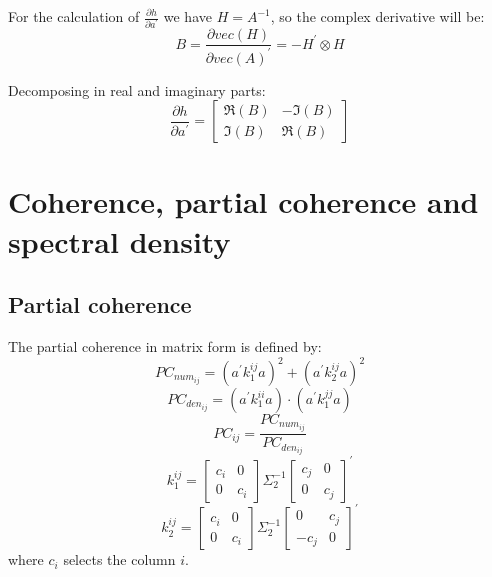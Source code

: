 \documentclass[a4paper,10pt]{article}
\begin{document}
For the calculation of  $\frac{\partial h}{\partial a^{'}}$ we have $H = A^{-1}$, so the complex derivative will be:
\begin{equation}
B = \frac{\partial vec(H)}{\partial vec(A)^{'}} = -H^{'} \otimes H
\end{equation}

Decomposing in real and imaginary parts:
\begin{equation}
\frac{\partial h}{\partial a^{'}} = \left[ \begin{array}{cc} \Re(B) & -\Im(B) \\ \Im(B) & \Re(B)
\end{array} \right]
\end{equation}

\section{Coherence, partial coherence and spectral density}

\subsection{Partial coherence}

The partial coherence in matrix form is defined by:
\begin{equation}
PC_{num_{ij}} = \left( a^{'} k_{1}^{ij} a \right)^{2} + \left( a^{'} k_{2}^{ij} a \right)^{2}
\end{equation}
\begin{equation}
PC_{den_{ij}} = \left( a^{'} k_{1}^{ii} a \right) \cdot \left( a^{'} k_{1}^{jj} a \right)
\end{equation}
\begin{equation}
PC_{ij} = \frac{PC_{num_{ij}}}{PC_{den_{ij}}}
\end{equation}
\begin{equation}
k_{1}^{ij} = \left[ \begin{array}{cc}
 c_{i} & 0 \\ 0 & c_{i}
\end{array} \right] \Sigma_{2}^{-1} \left[ \begin{array}{cc}
 c_{j} & 0 \\ 0 & c_{j}
\end{array} \right]^{'}
\end{equation}
\begin{equation}
k_{2}^{ij} = \left[ \begin{array}{cc}
 c_{i} & 0 \\ 0 & c_{i}
\end{array} \right] \Sigma_{2}^{-1} \left[ \begin{array}{cc}
 0 & c_{j} \\ -c_{j} & 0
\end{array} \right]^{'} 
\end{equation}
where $c_i$ selects the column $i$. 
\end{document}
